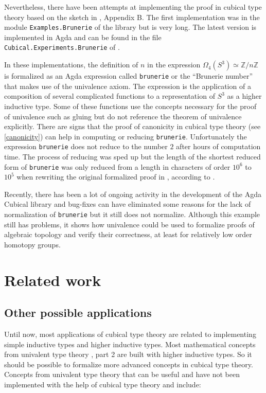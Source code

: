 \documentclass[12pt,a4paper,twoside,xetex]{book} %
\begin{document}
Nevertheless, there have been attempts at implementing the proof in cubical type 
theory based on the sketch in \cite{Brunerie2016}, Appendix B. The first 
implementation was in the module \texttt{Examples.Brunerie} of the library 
\cite{Moertberg2015} but is very long. The latest version is implemented in Agda 
and can be found in the file  \texttt{Cubical.Experiments.Brunerie} of 
\cite{Moertberg2018}. 

In these implementations, the definition of  $n$ in the expression 
$\Omega_4(S^3) \simeq \mathbb{Z}/n\mathbb{Z}$ is formalized as an Agda 
expression called \texttt{brunerie} or the ``Brunerie number'' that makes use 
of the univalence axiom. The expression is the application of a composition of 
several complicated functions to a representation of $S^3$ as a higher 
inductive type. Some of these functions use the concepts necessary for the proof 
of univalence such as gluing but do not reference the theorem of 
univalence explicitly. There are signs that the proof of canonicity in 
cubical type theory (see \cref{canonicity}) can help in computing 
or reducing \texttt{brunerie}. Unfortunately the expression 
\texttt{brunerie} does not reduce to the number $2$ after hours of 
computation time. The process of reducing was sped up but the length of the
shortest reduced form of  \texttt{brunerie} was  only 
reduced from a length in characters of order $10^6$ to $10^5$ when rewriting 
the original formalized proof \cite{Moertberg2015} in \cite{Moertberg2018},  
according to \cite{Brunerie2018}.

Recently, there has been a lot of ongoing activity in the development of the 
Agda Cubical library and bug-fixes can have eliminated some reasons for the lack 
of normalization of \texttt{brunerie} but it still does not normalize. Although this example still has problems, 
it shows how univalence could be used to formalize proofs of algebraic topology 
and verify their correctness, at least for relatively low order homotopy groups.

\chapter{Related work}

\section{Other possible applications}\label{futapp}

Until now, most applications of cubical type theory are related to implementing 
simple inductive types and higher inductive types. Most mathematical concepts 
from univalent type theory \cite{Voevodsky2013}, part 2 are built with higher 
inductive types. So it should be possible to formalize more advanced concepts in 
cubical type theory. Concepts from univalent type theory that can be useful and 
have not been implemented with the help of cubical type theory and 
\cite{Moertberg2018} include:
\end{document}
